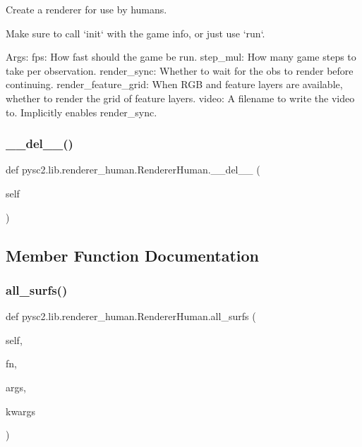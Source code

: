 \begin{DoxyVerb}Create a renderer for use by humans.

Make sure to call `init` with the game info, or just use `run`.

Args:
  fps: How fast should the game be run.
  step_mul: How many game steps to take per observation.
  render_sync: Whether to wait for the obs to render before continuing.
  render_feature_grid: When RGB and feature layers are available, whether
  to render the grid of feature layers.
  video: A filename to write the video to. Implicitly enables render_sync.
\end{DoxyVerb}
 \mbox{\label{classpysc2_1_1lib_1_1renderer__human_1_1_renderer_human_a74cbc7712f1c882681908b038fd2329e}} 
\subsubsection{\texorpdfstring{\+\_\+\+\_\+del\+\_\+\+\_\+()}{\_\_del\_\_()}}
{\footnotesize\ttfamily def pysc2.\+lib.\+renderer\+\_\+human.\+Renderer\+Human.\+\_\+\+\_\+del\+\_\+\+\_\+ (\begin{DoxyParamCaption}\item[{}]{self }\end{DoxyParamCaption})}



\subsection{Member Function Documentation}
\mbox{\label{classpysc2_1_1lib_1_1renderer__human_1_1_renderer_human_a35641fd0489ce873dab71c737a54363d}} 
\subsubsection{\texorpdfstring{all\+\_\+surfs()}{all\_surfs()}}
{\footnotesize\ttfamily def pysc2.\+lib.\+renderer\+\_\+human.\+Renderer\+Human.\+all\+\_\+surfs (\begin{DoxyParamCaption}\item[{}]{self,  }\item[{}]{fn,  }\item[{}]{args,  }\item[{}]{kwargs }\end{DoxyParamCaption})}

